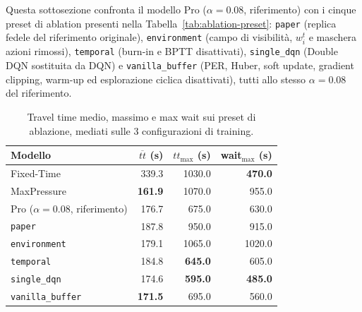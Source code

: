 Questa sottosezione confronta il modello Pro ($\alpha=0.08$, riferimento)
con i cinque preset di ablation presenti nella Tabella~\ref{tab:ablation-preset}:
\texttt{paper} (replica fedele del riferimento originale), \texttt{environment}
(campo di visibilità, $w_i^t$ e maschera azioni rimossi),
\texttt{temporal} (burn-in e BPTT disattivati), \texttt{single\_dqn}
(Double DQN sostituita da DQN) e \texttt{vanilla\_buffer} (PER, Huber, soft
update, gradient clipping, warm-up ed esplorazione ciclica disattivati),
tutti allo stesso $\alpha=0.08$ del riferimento.

\begin{table}[htbp]
  \centering
  \begin{tabular}{@{}lrrr@{}}
    \toprule
    Modello                          & $\overline{tt}$ (s) & $tt_{\max}$ (s) & wait$_{\max}$ (s) \\
    \midrule
    Fixed-Time                       & 339.3               & 1030.0          & \textbf{470.0}    \\
    MaxPressure                      & \textbf{161.9}      & 1070.0          & 955.0             \\
    Pro ($\alpha=0.08$, riferimento) & 176.7               & 675.0           & 630.0             \\
    \texttt{paper}                   & 187.8               & 950.0           & 915.0             \\
    \texttt{environment}             & 179.1               & 1065.0          & 1020.0            \\
    \texttt{temporal}                & 184.8               & \textbf{645.0}  & 605.0             \\
    \texttt{single\_dqn}             & 174.6               & \textbf{595.0}  & \textbf{485.0}    \\
    \texttt{vanilla\_buffer}         & \textbf{171.5}      & 695.0           & 560.0             \\
    \bottomrule
  \end{tabular}
  \caption{Travel time medio, massimo e max wait sui preset
    di ablazione, mediati sulle 3 configurazioni di training.}
  \label{tab:ablation-train}
\end{table}

